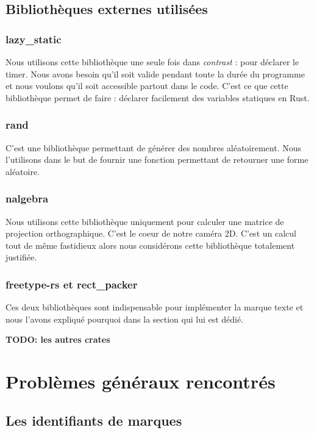 \documentclass[12pt]{article}
\begin{document}
\subsection{Bibliothèques externes utilisées}
\subsubsection{lazy\_static}
Nous utilisons cette bibliothèque \cite{lazy-static} une seule fois dans
\textit{contrast} : pour déclarer le timer. Nous avons besoin qu'il soit valide pendant
toute la durée du programme et nous voulons qu'il soit accessible partout dans le code.
C'est ce que cette bibliothèque permet de faire : déclarer facilement des variables
statiques en Rust.

\subsubsection{rand}
C'est une bibliothèque \cite{rand} permettant de générer des nombres aléatoirement. Nous
l'utilisons dans le but de fournir une fonction permettant de retourner une forme
aléatoire.

\subsubsection{nalgebra}
Nous utilisons cette bibliothèque \cite{nalgebra} uniquement pour calculer une matrice de projection orthographique.
C'est le coeur de notre caméra 2D. C'est un calcul tout de même fastidieux alors nous considérons cette bibliothèque totalement justifiée.

\subsubsection{freetype-rs et rect\_packer}
Ces deux bibliothèques sont indispensable pour implémenter la marque texte et nous l'avons expliqué pourquoi dans la section qui lui est dédié.

\textbf{TODO: les autres crates}

\section{Problèmes généraux rencontrés}
\subsection{Les identifiants de marques}
\end{document}
